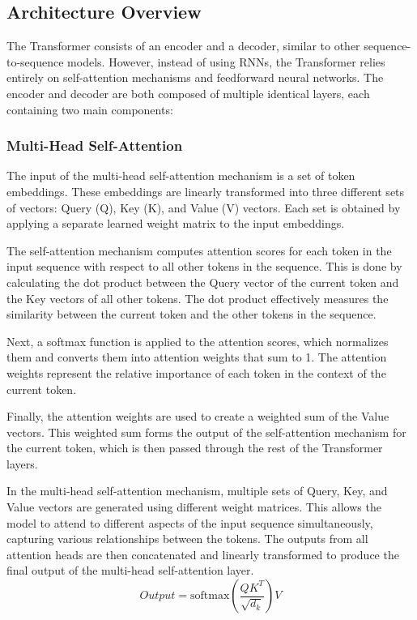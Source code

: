 \documentclass[12pt]{article}
\begin{document}
\subsection{Architecture Overview}

The Transformer consists of an encoder and a decoder, similar to other sequence-to-sequence models. However, instead of using RNNs, the Transformer relies entirely on self-attention mechanisms and feedforward neural networks. The encoder and decoder are both composed of multiple identical layers, each containing two main components:


\subsubsection{Multi-Head Self-Attention}

The input of the multi-head self-attention mechanism is a set of token embeddings. These embeddings are linearly transformed into three different sets of vectors: Query (Q), Key (K), and Value (V) vectors. Each set is obtained by applying a separate learned weight matrix to the input embeddings.

The self-attention mechanism computes attention scores for each token in the input sequence with respect to all other tokens in the sequence. This is done by calculating the dot product between the Query vector of the current token and the Key vectors of all other tokens. The dot product effectively measures the similarity between the current token and the other tokens in the sequence.

Next, a softmax function is applied to the attention scores, which normalizes them and converts them into attention weights that sum to 1. The attention weights represent the relative importance of each token in the context of the current token.

Finally, the attention weights are used to create a weighted sum of the Value vectors. This weighted sum forms the output of the self-attention mechanism for the current token, which is then passed through the rest of the Transformer layers.

In the multi-head self-attention mechanism, multiple sets of Query, Key, and Value vectors are generated using different weight matrices. This allows the model to attend to different aspects of the input sequence simultaneously, capturing various relationships between the tokens. The outputs from all attention heads are then concatenated and linearly transformed to produce the final output of the multi-head self-attention layer.
$$Output = \text{softmax} \left( \frac{QK^T}{\sqrt{d_k}} \right) V $$
\end{document}
